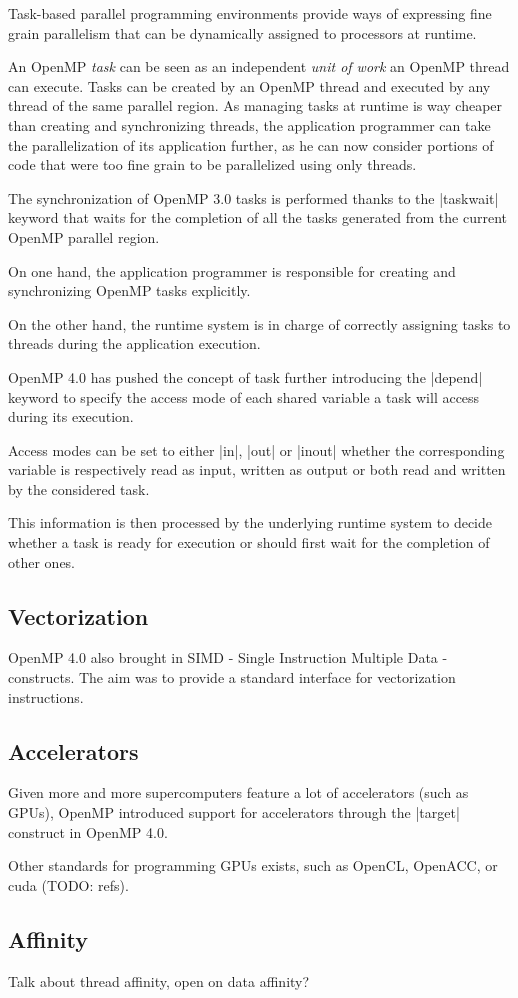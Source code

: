 Task-based parallel programming environments provide ways of expressing fine grain parallelism that can be dynamically assigned to processors at runtime.

An OpenMP \emph{task} can be seen as an independent \emph{unit of work} an OpenMP thread can execute.
Tasks can be created by an OpenMP thread and executed by any thread of the same parallel region.
As managing tasks at runtime is way cheaper than creating and synchronizing threads, the application programmer can take the parallelization of its application further, as he can now consider portions of code that were too fine grain to be parallelized using only threads.

The synchronization of OpenMP 3.0 tasks is performed thanks to the |taskwait| keyword that waits for the completion of all the tasks generated from the current OpenMP parallel region.

On one hand, the application programmer is responsible for creating and synchronizing OpenMP tasks explicitly.

On the other hand, the runtime system is in charge of correctly assigning tasks to threads during the application execution.

OpenMP 4.0 has pushed the concept of task further introducing the |depend| keyword to specify the access mode of each shared variable a task will access during its execution.

Access modes can be set to either |in|, |out| or |inout| whether the corresponding variable is respectively read as input, written as output or both read and written by the considered task.

This information is then processed by the underlying runtime system to decide whether a task is ready for execution or should first wait for the completion of other ones.


\subsection{Vectorization}

OpenMP 4.0 also brought in SIMD - Single Instruction Multiple Data - constructs.
The aim was to provide a standard interface for vectorization instructions.


\subsection{Accelerators}

Given more and more supercomputers feature a lot of accelerators (such as GPUs), OpenMP introduced support for accelerators through the |target| construct in OpenMP 4.0.

Other standards for programming GPUs exists, such as OpenCL, OpenACC, or cuda (TODO: refs).

\subsection{Affinity}

Talk about thread affinity, open on data affinity?

